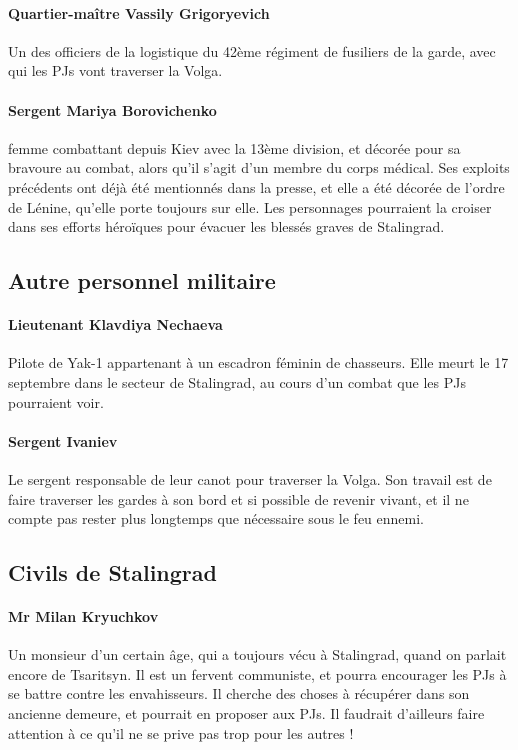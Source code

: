 \documentclass{report}
\begin{document}
\begin{multicols}{2}
\paragraph{Quartier-maître Vassily Grigoryevich} Un des officiers de la logistique du 42ème régiment de fusiliers de la garde, avec qui les PJs vont traverser la Volga.
\paragraph{Sergent Mariya Borovichenko}femme combattant depuis Kiev avec la 13ème division, et décorée pour sa bravoure au combat, alors qu'il s'agit d'un membre du corps médical. Ses exploits précédents ont déjà été mentionnés dans la presse, et elle a été décorée de l'ordre de Lénine, qu'elle porte toujours sur elle. Les personnages pourraient la croiser dans ses efforts héroïques pour évacuer les blessés graves de Stalingrad.
\subsection{Autre personnel militaire}
\paragraph{Lieutenant Klavdiya Nechaeva}
Pilote de Yak-1 appartenant à un escadron féminin de chasseurs. Elle meurt le 17 septembre dans le secteur de Stalingrad, au cours d'un combat que les PJs pourraient voir.
\paragraph{Sergent Ivaniev} Le sergent responsable de leur canot pour traverser la Volga. Son travail est de faire traverser les gardes à son bord et si possible de revenir vivant, et il ne compte pas rester plus longtemps que nécessaire sous le feu ennemi.
\subsection{Civils de Stalingrad}
\paragraph{ Mr Milan Kryuchkov} Un monsieur d'un certain âge, qui a toujours vécu à Stalingrad, quand on parlait encore de Tsaritsyn. Il est un fervent communiste, et pourra encourager les PJs à se battre contre les envahisseurs. Il cherche des choses à récupérer dans son ancienne demeure, et pourrait en proposer aux PJs. Il faudrait d'ailleurs faire attention à ce qu'il ne se prive pas trop pour les autres !

\end{multicols}
\end{document}
